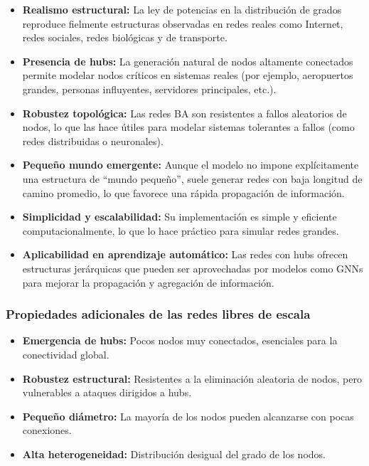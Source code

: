 \begin{itemize}
    \item \textbf{Realismo estructural:} La ley de potencias en la distribución de grados reproduce fielmente estructuras observadas en redes reales como Internet, redes sociales, redes biológicas y de transporte.
    
    \item \textbf{Presencia de hubs:} La generación natural de nodos altamente conectados permite modelar nodos críticos en sistemas reales (por ejemplo, aeropuertos grandes, personas influyentes, servidores principales, etc.).
    
    \item \textbf{Robustez topológica:} Las redes BA son resistentes a fallos aleatorios de nodos, lo que las hace útiles para modelar sistemas tolerantes a fallos (como redes distribuidas o neuronales).
    
    \item \textbf{Pequeño mundo emergente:} Aunque el modelo no impone explícitamente una estructura de “mundo pequeño”, suele generar redes con baja longitud de camino promedio, lo que favorece una rápida propagación de información.

    \item \textbf{Simplicidad y escalabilidad:} Su implementación es simple y eficiente computacionalmente, lo que lo hace práctico para simular redes grandes.
    
    \item \textbf{Aplicabilidad en aprendizaje automático:} Las redes con hubs ofrecen estructuras jerárquicas que pueden ser aprovechadas por modelos como GNNs para mejorar la propagación y agregación de información.
\end{itemize}

\subsubsection*{Propiedades adicionales de las redes libres de escala \citep{watts1998collective}}

\begin{itemize}
    \item \textbf{Emergencia de hubs:} Pocos nodos muy conectados, esenciales para la conectividad global.
    \item \textbf{Robustez estructural:} Resistentes a la eliminación aleatoria de nodos, pero vulnerables a ataques dirigidos a hubs.
    \item \textbf{Pequeño diámetro:} La mayoría de los nodos pueden alcanzarse con pocas conexiones.
    \item \textbf{Alta heterogeneidad:} Distribución desigual del grado de los nodos.
\end{itemize}

